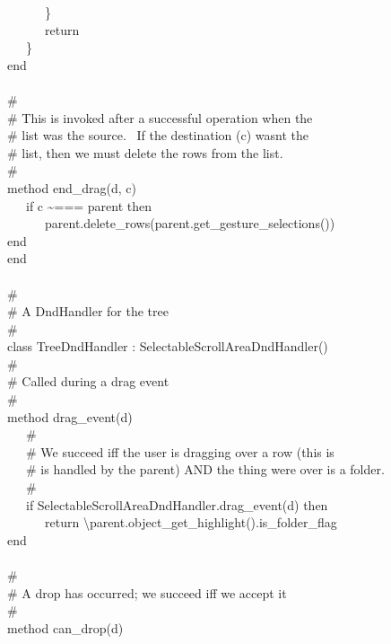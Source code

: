 {\>   \ \ \ \ \ \ \} \\
\>   \ \ \ \ \ \ return \\
\>   \ \ \ \} \\
\>   end \\
\ \\
\>   \# \\
\>   \# This is invoked after a successful operation when the \\
\>   \# list was the source. \ If the destination (c)
wasn{\textquotesingle}t the \\
\>   \# list, then we must delete the rows from the list. \\
\>   \# \\
\>   method end\_drag(d, c) \\
\>   \ \ \ if c \~{}=== parent then \\
\>   \ \ \ \ \ \ parent.delete\_rows(parent.get\_gesture\_selections()) \\
\>   end \\
end \\
\ \\
\# \\
\# A DndHandler for the tree \\
\# \\
class TreeDndHandler : SelectableScrollAreaDndHandler() \\
\>   \# \\
\>   \# Called during a drag event \\
\>   \# \\
\>   method drag\_event(d) \\
\>   \ \ \ \# \\
\>   \ \ \ \# We succeed iff the user is dragging over a row (this is \\
\>   \ \ \ \# is handled by the parent) AND the thing we{\textquotesingle}re over is a folder. \\
\>   \ \ \ \# \\
\>   \ \ \ if SelectableScrollAreaDndHandler.drag\_event(d) then \\
\>   \ \ \ \ \ \ return
{\textbackslash}parent.object\_get\_highlight().is\_folder\_flag \\
\>   end \\
\ \\
\>   \# \\
\>   \# A drop has occurred; we succeed iff we accept it \\
\>   \# \\
\>   method can\_drop(d) \\
}
